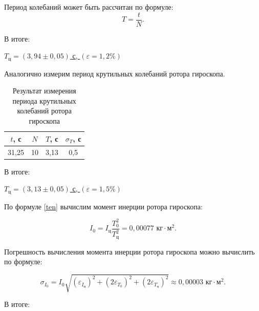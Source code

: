 \documentclass[a4paper, 12pt]{article}
\begin{document}
\begin{center}
    \label{formuli}

    Период колебаний может быть рассчитан по формуле:
    \begin{equation}
        T = \frac{t}{N}.
    \end{equation}


    В итоге: 
    \bigskip

    \underline{$ T_\text{ц} = \left( 3,94 \pm 0,05\right) $ с, $ \left(\varepsilon = 1,2 \% \right)  $}

    \newpage

    Аналогично измерим период крутильных колебаний ротора гироскопа.

    \bigskip

    \begin{table}[H]
    	\centering
    	\begin{tabular}{|c|c|c|c|}
    		                                                       \hline
    		$ t $, с & $ N $ & $ T $, с & $ \sigma_T $, с      \\ \hline
                31,25    &   10  &  3,13    & 0,5                  \\ \hline
    	\end{tabular}
    	\caption{Результат измерения периода крутильных колебаний ротора гироскопа}
    	\label{krut_gil}
    \end{table}

     В итоге: 
    \bigskip

    \underline{$ T_\text{ц} = \left( 3,13 \pm 0,05\right) $ с, $ \left(\varepsilon = 1,5 \% \right)  $}

    \bigskip
    
    По формуле \eqref{ten} вычислим момент инерции ротора гироскопа:

    \begin{equation}
        I_0=I_\text{ц}\frac{T_0^2}{T_\text{ц}^2} = 0,00077 \text{ кг} \cdot \text{м}^2.
    \end{equation}

Погрешность вычисления момента инерции ротора гироскопа можно вычислить по формуле:

    \begin{equation}
        \sigma_{I_0} = I_0\sqrt{\left( \varepsilon_{I_\text{ц}} \right)^2 +\left( 2 \varepsilon_{T_0} \right)^2 + \left(2 \varepsilon_{T_\text{ц}} \right)^2} \approx 0,00003 \text{ кг} \cdot \text{м}^2.
    \end{equation}

В итоге:


\end{center}
\end{document}
